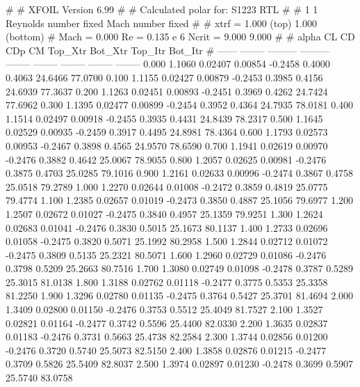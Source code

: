 #  
#       XFOIL         Version 6.99
#  
# Calculated polar for: S1223 RTL                                       
#  
# 1 1 Reynolds number fixed          Mach number fixed         
#  
# xtrf =   1.000 (top)        1.000 (bottom)  
# Mach =   0.000     Re =     0.135 e 6     Ncrit =   9.000  9.000
#  
#   alpha    CL        CD       CDp       CM     Top_Xtr  Bot_Xtr  Top_Itr  Bot_Itr
#  ------ -------- --------- --------- -------- -------- -------- -------- --------
   0.000   1.1060   0.02407   0.00854  -0.2458   0.4000   0.4063  24.6466  77.0700
   0.100   1.1155   0.02427   0.00879  -0.2453   0.3985   0.4156  24.6939  77.3637
   0.200   1.1263   0.02451   0.00893  -0.2451   0.3969   0.4262  24.7424  77.6962
   0.300   1.1395   0.02477   0.00899  -0.2454   0.3952   0.4364  24.7935  78.0181
   0.400   1.1514   0.02497   0.00918  -0.2455   0.3935   0.4431  24.8439  78.2317
   0.500   1.1645   0.02529   0.00935  -0.2459   0.3917   0.4495  24.8981  78.4364
   0.600   1.1793   0.02573   0.00953  -0.2467   0.3898   0.4565  24.9570  78.6590
   0.700   1.1941   0.02619   0.00970  -0.2476   0.3882   0.4642  25.0067  78.9055
   0.800   1.2057   0.02625   0.00981  -0.2476   0.3875   0.4703  25.0285  79.1016
   0.900   1.2161   0.02633   0.00996  -0.2474   0.3867   0.4758  25.0518  79.2789
   1.000   1.2270   0.02644   0.01008  -0.2472   0.3859   0.4819  25.0775  79.4774
   1.100   1.2385   0.02657   0.01019  -0.2473   0.3850   0.4887  25.1056  79.6977
   1.200   1.2507   0.02672   0.01027  -0.2475   0.3840   0.4957  25.1359  79.9251
   1.300   1.2624   0.02683   0.01041  -0.2476   0.3830   0.5015  25.1673  80.1137
   1.400   1.2733   0.02696   0.01058  -0.2475   0.3820   0.5071  25.1992  80.2958
   1.500   1.2844   0.02712   0.01072  -0.2475   0.3809   0.5135  25.2321  80.5071
   1.600   1.2960   0.02729   0.01086  -0.2476   0.3798   0.5209  25.2663  80.7516
   1.700   1.3080   0.02749   0.01098  -0.2478   0.3787   0.5289  25.3015  81.0138
   1.800   1.3188   0.02762   0.01118  -0.2477   0.3775   0.5353  25.3358  81.2250
   1.900   1.3296   0.02780   0.01135  -0.2475   0.3764   0.5427  25.3701  81.4694
   2.000   1.3409   0.02800   0.01150  -0.2476   0.3753   0.5512  25.4049  81.7527
   2.100   1.3527   0.02821   0.01164  -0.2477   0.3742   0.5596  25.4400  82.0330
   2.200   1.3635   0.02837   0.01183  -0.2476   0.3731   0.5663  25.4738  82.2584
   2.300   1.3744   0.02856   0.01200  -0.2476   0.3720   0.5740  25.5073  82.5150
   2.400   1.3858   0.02876   0.01215  -0.2477   0.3709   0.5826  25.5409  82.8037
   2.500   1.3974   0.02897   0.01230  -0.2478   0.3699   0.5907  25.5740  83.0758
